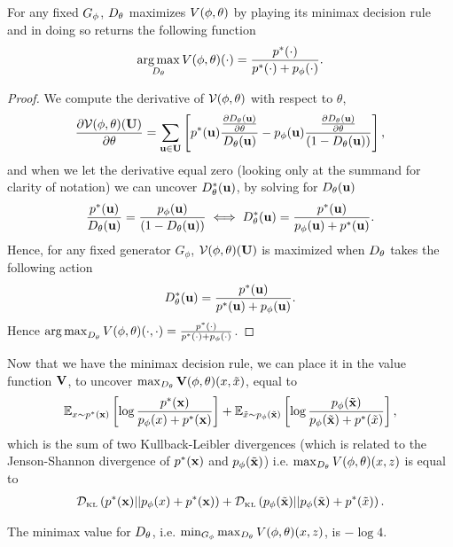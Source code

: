 \begin{theorem}%
 \label{theorem:minimax}
 For any fixed $G_\phi$, $D_\theta$ maximizes $V(\phi, \theta)$ by playing its minimax
 decision rule and in doing so returns the following function
  \begin{align}
    \operatorname*{arg\,max}_{D_\theta}V(\phi, \theta)(\cdot) = {p^*(\mathbf{\cdot}) \over p^*(\mathbf{\cdot}) + p_{\phi}(\mathbf{\cdot})}.
  \end{align}
\end{theorem}

\begin{proof}
  We compute the derivative of $\mathcal{V}(\phi, \theta)$ with respect to $\theta$,
  \begin{align}
    \label{eq:derivatives}
    {\partial \Va(\*U) \over \partial \theta} = \sum_{\*u \in \*U}\left[ \ptu { {\partial \D(\*u) \over \partial \theta} \over \D(\*u)} -
    \pgu {{\partial \D(\*u) \over \partial \theta} \over (1 - \D(\*u))}\right],
  \end{align}
  and when we let the derivative equal zero (looking only at the summand for
  clarity of notation) we can uncover $D_\theta^*(\mathbf{u})$, by solving for $D_\theta(\mathbf{u})$
  \begin{align}
    \label{eq:20}
    {\ptu \over \D(\*u)} = {\pgu \over (1 - \D(\*u))} \iff \D^*(\*u) = {\ptu \over \pgu + \ptu}.
  \end{align}
  Hence, for any fixed generator $G_\phi$, $\mathcal{V}(\phi, \theta)(\mathbf{U})$ is maximized when $D_\theta$ takes
  the following action
  \begin{align}
    \label{eq:13}
    \D^*(\*u) = \Dstar{u}.
  \end{align}
  Hence $\operatorname*{arg\,max}_{D_\theta}V(\phi, \theta)(\cdot, \cdot) = {p^*(\mathbf{\cdot}) \over p^*(\mathbf{\cdot}) + p_{\phi}(\mathbf{\cdot})}$.
\end{proof}

Now that we have the minimax decision rule, we can place it in the
value function $\mathbf{V}$, to uncover $\max_{D_\theta}\mathbf{V}(\phi, \theta)(x, \tilde{x})$,
equal to
\begin{align}
  \label{eq:sum-of-two-kl-divergences}
   \mathbb{E}_{x \sim \pt}\left[\log{{\pt \over p_{\phi}(x)+ \pt}}\right] + \mathbb{E}_{\tilde{x} \sim \pg}\left[\log{\pg \over \pg + p^*(\tilde{x})} \right],
\end{align}
which is the sum of two Kullback-Leibler divergences (which is related
to the Jenson-Shannon divergence of $p^*(\mathbf{x})$ and $p_{\phi}(\tilde{\mathbf{x}})$)
i.e. $\max_{D_\theta}V(\phi, \theta)(x, z)$ is equal to
\begin{align}
  \label{eq:16}
  \KL{\pt}{p_{\phi}(x) + \pt} + \KL{\pg}{\pg + p^*(\tilde{x})}.
\end{align}
\begin{lemma}
  The minimax value for $D_\theta$, i.e. $\min_{G_\phi}\max_{D_\theta}V(\phi, \theta)(x, z)$, is $ - \log{4}$.
\end{lemma}

